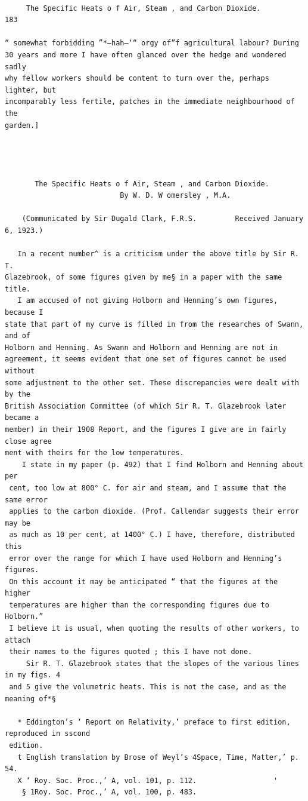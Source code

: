 \documentclass[10pt]{article}
\begin{document}
\clearpage
\begin{verbatim}

     The Specific Heats o f Air, Steam , and Carbon Dioxide.                        183

“ somewhat forbidding ”*—hah—‘“ orgy of”f agricultural labour? During
30 years and more I have often glanced over the hedge and wondered sadly
why fellow workers should be content to turn over the, perhaps lighter, but
incomparably less fertile, patches in the immediate neighbourhood of the
garden.]




       The Specific Heats o f Air, Steam , and Carbon Dioxide.
                           By W. D. W omersley , M.A.

    (Communicated by Sir Dugald Clark, F.R.S.         Received January 6, 1923.)

   In a recent number^ is a criticism under the above title by Sir R. T.
Glazebrook, of some figures given by me§ in a paper with the same title.
   I am accused of not giving Holborn and Henning’s own figures, because I
state that part of my curve is filled in from the researches of Swann, and of
Holborn and Henning. As Swann and Holborn and Henning are not in
agreement, it seems evident that one set of figures cannot be used without
some adjustment to the other set. These discrepancies were dealt with by the
British Association Committee (of which Sir R. T. Glazebrook later became a
member) in their 1908 Report, and the figures I give are in fairly close agree­
ment with theirs for the low temperatures.
    I state in my paper (p. 492) that I find Holborn and Henning about         per
 cent, too low at 800° C. for air and steam, and I assume that the same error
 applies to the carbon dioxide. (Prof. Callendar suggests their error may be
 as much as 10 per cent, at 1400° C.) I have, therefore, distributed this
 error over the range for which I have used Holborn and Henning’s figures.
 On this account it may be anticipated “ that the figures at the higher
 temperatures are higher than the corresponding figures due to Holborn.”
 I believe it is usual, when quoting the results of other workers, to attach
 their names to the figures quoted ; this I have not done.
     Sir R. T. Glazebrook states that the slopes of the various lines in my figs. 4
 and 5 give the volumetric heats. This is not the case, and as the meaning of*§

   * Eddington’s ‘ Report on Relativity,’ preface to first edition, reproduced in sscond
 edition.
   t English translation by Brose of Weyl’s 4Space, Time, Matter,’ p. 54.
   X ‘ Roy. Soc. Proc.,’ A, vol. 101, p. 112.                  '
    § 1Roy. Soc. Proc.,’ A, vol. 100, p. 483.

\end{verbatim}
\end{document}
